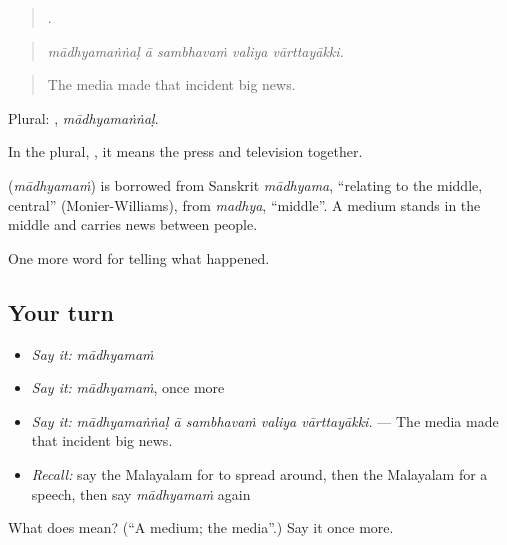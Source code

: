 \begin{quote}
    .
\end{quote}

\begin{quote}
\emph{mādhyamaṅṅaḷ ā sambhavaṁ valiya vārttayākki.}
\end{quote}

\begin{quote}
The media made that incident big news.
\end{quote}

Plural: , \emph{mādhyamaṅṅaḷ}.

In the plural, , it means the press and television together.

\begin{cousinweb}
\textbf{} (\emph{mādhyamaṁ}) is borrowed from Sanskrit \emph{mādhyama}, \textquotedblleft{}relating to the middle, central\textquotedblright{} (Monier-Williams), from \emph{madhya}, \textquotedblleft{}middle\textquotedblright{}. A medium stands in the middle and carries news between people.
\end{cousinweb}

\begin{grammarlens}[title={What you've built}]
One more word for telling what happened.
\end{grammarlens}

\subsection*{Your turn}
\begin{itemize}
\raggedright
  \item \emph{Say it:} \emph{mādhyamaṁ}
  \item \emph{Say it:} \emph{mādhyamaṁ}, once more
  \item \emph{Say it:} \emph{mādhyamaṅṅaḷ ā sambhavaṁ valiya vārttayākki.} — The media made that incident big news.
  \item \emph{Recall:} say the Malayalam for to spread around, then the Malayalam for a speech, then say \emph{mādhyamaṁ} again
\end{itemize}

\begin{tcolorbox}[breakable,colback=teal!4,colframe=teal!35!black,title={Before you move on}]
What does  mean? (\textquotedblleft{}A medium; the media\textquotedblright{}.) Say it once more.
\end{tcolorbox}

